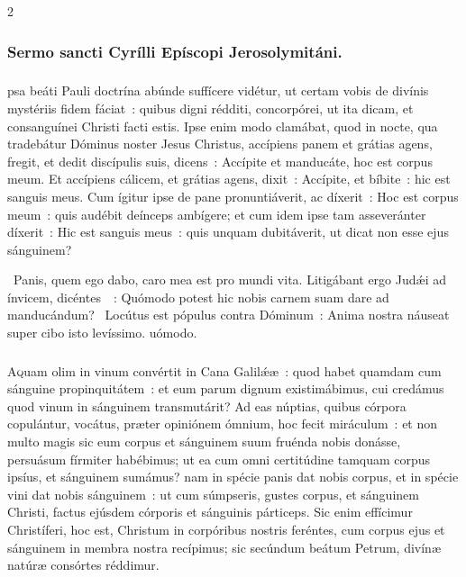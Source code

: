 \documentclass[9pt,twoside]{extarticle}
\begin{document}
\begin{multicols}{2}
{\subsubsection*{\center Sermo sancti Cyrílli Epíscopi Jerosolymitáni.}
\subsubsection*{\center {}}
psa beáti Pauli doctrína abúnde suffícere vidétur, ut certam vobis de divínis mystériis fidem fáciat~: quibus digni rédditi, concorpórei, ut ita dicam, et consanguínei Christi facti estis. Ipse enim modo clamábat, quod in nocte, qua tradebátur Dóminus noster Jesus Christus, accípiens panem et grátias agens, fregit, et dedit discípulis suis, dicens~: Accípite et manducáte, hoc est corpus meum. Et accípiens cálicem, et grátias agens, dixit~: Accípite, et bíbite~: hic est sanguis meus. Cum ígitur ipse de pane pronuntiáverit, ac díxerit~: Hoc est corpus meum~: quis audébit deínceps ambígere; et cum idem ipse tam asseveránter díxerit~: Hic est sanguis meus~: quis unquam dubitáverit, ut dicat non esse ejus sánguinem?

\begin{tightlist}{}
~Panis, quem ego dabo, caro mea est pro mundi vita. Litigábant ergo Judǽi ad ínvicem, dicéntes~~: \textred{*} Quómodo potest hic nobis carnem suam dare ad manducándum? ~Locútus est pópulus contra Dóminum~: Anima nostra náuseat super cibo isto levíssimo. uómodo.
\end{tightlist}

\subsubsection*{\center {}}
\lettrine{A}quam olim in vinum convértit in Cana Galilǽæ~: quod habet quamdam cum sánguine propinquitátem~: et eum parum dignum existimábimus, cui credámus quod vinum in sánguinem transmutárit? Ad eas núptias, quibus córpora copulántur, vocátus, præter opiniónem ómnium, hoc fecit miráculum~: et non multo magis sic eum corpus et sánguinem suum fruénda nobis donásse, persuásum fírmiter habébimus; ut ea cum omni certitúdine tamquam corpus ipsíus, et sánguinem sumámus? nam in spécie panis dat nobis corpus, et in spécie vini dat nobis sánguinem~: ut cum súmpseris, gustes corpus, et sánguinem Christi, factus ejúsdem córporis et sánguinis párticeps. Sic enim effícimur Christíferi, hoc est, Christum in corpóribus nostris feréntes, cum corpus ejus et sánguinem in membra nostra recípimus; sic secúndum beátum Petrum, divínæ natúræ consórtes réddimur.

}
\end{multicols}
\end{document}

